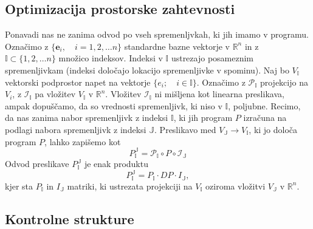 \documentclass{article}
\newcommand{\RR}{\mathbb{R}}
\newcommand{\II}{\mathbb{I}}
\newcommand{\JJ}{\mathbb{J}}
\newcommand{\e}{\mathbf{e}}
\begin{document}
 \subsection{Optimizacija prostorske zahtevnosti}
 Ponavadi nas ne zanima odvod po vseh spremenljvkah, ki jih imamo v programu.
 Označimo z $\{\e_i,\quad i=1,2,\ldots n\}$ standardne bazne vektorje v $\RR^n$ in z
 $\II\subset\{1,2,\ldots n\}$ množico indeksov. Indeksi v $\II$ ustrezajo
 posameznim spremenljivkam (indeksi določajo lokacijo spremenljivke v spominu). Naj bo $V_\II$ vektorski
 podprostor napet na vektorje $\{e_i;\quad i\in\II\}$. Označimo z 
 $\mathcal{P}_\II$ projekcijo na $V_i$, z $\mathcal{I}_\II$ pa vložitev $V_\II$ v
 $\RR^n$. Vložitev $\mathcal{I}_\II$ ni mišljena kot linearna preslikava, ampak
 dopuščamo, da so vrednosti spremenljivk, ki niso v $\II$, poljubne. Recimo, da nas zanima nabor spremenljivk z indeksi $\II$, ki jih
 program $P$ izračuna na podlagi nabora spremenljivk z indeksi $\mathbb{J}$.
 Preslikavo med $V_\JJ\to V_\II$, ki jo določa program $P$, lahko zapišemo kot
 \begin{equation}
   \label{eq:zozitev}
   P^{\JJ}_{\II}=\mathcal{P}_\II\circ P\circ \mathcal{I}_\JJ 
 \end{equation}
 Odvod preslikave $ P^{\JJ}_{\II}$ je enak produktu
 \begin{equation*}
   P^{\JJ}_{\II}=P_\II\cdot DP\cdot I_\JJ,   
 \end{equation*}
 kjer sta $P_\II$ in  $I_\JJ$ matriki, ki ustrezata projekciji na $V_\II$ oziroma
 vložitvi $V_\JJ$ v $\RR^n$.
 
 
 
 \subsection{Kontrolne strukture}
 
\end{document}
